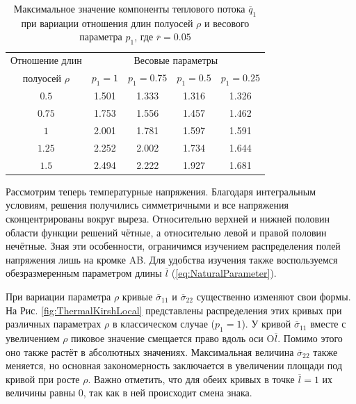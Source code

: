 \begin{table}[htbp]
    \centering
    \begin{threeparttable}%
        \caption{Максимальное значение компоненты теплового потока $\overline{q}_{1}$ при вариации отношения длин полуосей $\rho$ и весового параметра $p_1$, где $\overline{r} = 0.05$}\label{tab:MaxFlux}
        \begin{tabular}{|c|c|c|c|c|}
			\hline
			Отношение длин    & \multicolumn{4}{c|}{Весовые параметры} \\
			\cline{2-5}
			полуосей $\rho$   & $p_1 = 1$ & $p_1 = 0.75$ & $p_1 = 0.5$ & $p_1 = 0.25$ \\
			\hline
			$0.5$             & 1.501     & 1.333        & 1.316       & 1.326 \\
			\hline
			$0.75$            & 1.753     & 1.556        & 1.457       & 1.462  \\
			\hline
			$1$               & 2.001     & 1.781        & 1.597       & 1.591 \\
			\hline
			$1.25$            & 2.252     & 2.002        & 1.734       & 1.644 \\
			\hline
			$1.5$             & 2.494     & 2.222        & 1.927       & 1.681 \\
			\hline
        \end{tabular}
    \end{threeparttable}
\end{table}

Рассмотрим теперь температурные напряжения. Благодаря интегральным условиям, решения получились симметричными и все напряжения сконцентрированы вокруг выреза. Относительно верхней и нижней половин области функции решений чётные, а относительно левой и правой половин нечётные. Зная эти особенности, ограничимся изучением распределения полей напряжения лишь на кромке AB. Для удобства изучения также воспользуемся обезразмеренным параметром длины $\overline{l}$ (\ref{eq:NaturalParameter}).

При вариации параметра $\rho$ кривые $\overline{\sigma}_{11}$ и $\overline{\sigma}_{22}$ существенно изменяют свои формы. На Рис. \ref{fig:ThermalKirshLocal} представлены распределения этих кривых при различных параметрах $\rho$ в классическом случае ($p_1 = 1$). У кривой $\overline{\sigma}_{11}$ вместе с увеличением $\rho$ пиковое значение смещается право вдоль оси O$\overline{l}$. Помимо этого оно также растёт в абсолютных значениях. Максимальная величина $\overline{\sigma}_{22}$ также меняется, но основная закономерность заключается в увеличении площади под кривой при росте $\rho$. Важно отметить, что для обеих кривых в точке $\overline{l} = 1$ их величины равны 0, так как в ней происходит смена знака.

